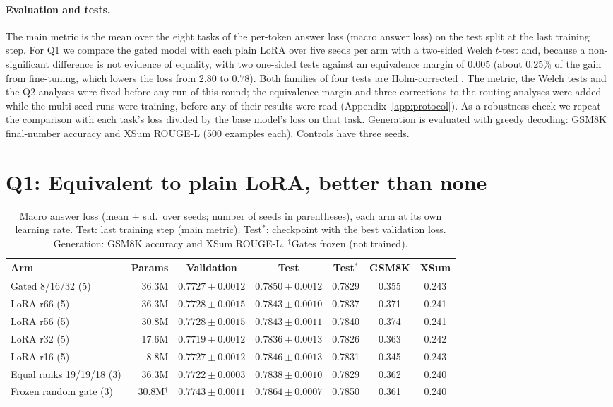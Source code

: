 \documentclass[11pt]{article}
\begin{document}
\paragraph{Evaluation and tests.} The main metric is the mean over the eight tasks of the
per-token answer loss (macro answer loss) on the test split at the last training step. For Q1 we
compare the gated model with each plain LoRA over five seeds per arm with a two-sided Welch
$t$-test and, because a non-significant difference is not evidence of equality, with two
one-sided tests \citep{schuirmann1987tost} against an equivalence margin of $0.005$ (about
0.25\% of the gain from fine-tuning, which lowers the loss from $2.80$ to $0.78$). Both families
of four tests are Holm-corrected \citep{holm1979}. The metric, the Welch tests and the Q2 analyses were
fixed before any run of this round; the equivalence margin and three corrections to the routing
analyses were added while the multi-seed runs were training, before any of their results were
read (Appendix~\ref{app:protocol}). As a robustness check we repeat the comparison with each task's
loss divided by the base model's loss on that task. Generation is evaluated with greedy decoding:
GSM8K final-number accuracy and XSum ROUGE-L (500 examples each). Controls have three seeds.

\section{Q1: Equivalent to plain LoRA, better than none}
\label{sec:q1}
\begin{table}[t]
\centering
\caption{Macro answer loss (mean $\pm$ s.d.\ over seeds; number of seeds in parentheses), each
arm at its own learning rate. Test: last training step (main metric). Test$^\ast$: checkpoint
with the best validation loss. Generation: GSM8K accuracy and XSum ROUGE-L. $^\dagger$Gates
frozen (not trained).}
\label{tab:q1}
\small\setlength{\tabcolsep}{4.5pt}
\begin{tabular}{lrccccc}
\toprule
Arm & Params & Validation & Test & Test$^\ast$ & GSM8K & XSum \\
\midrule
Gated 8/16/32 (5) & 36.3M & $0.7727 \pm 0.0012$ & $0.7850 \pm 0.0012$ & 0.7829 & 0.355 & 0.243 \\
LoRA r66 (5)      & 36.3M & $0.7728 \pm 0.0015$ & $0.7843 \pm 0.0010$ & 0.7837 & 0.371 & 0.241 \\
LoRA r56 (5)      & 30.8M & $0.7728 \pm 0.0015$ & $0.7843 \pm 0.0011$ & 0.7840 & 0.374 & 0.241 \\
LoRA r32 (5)      & 17.6M & $0.7719 \pm 0.0012$ & $0.7836 \pm 0.0013$ & 0.7826 & 0.363 & 0.242 \\
LoRA r16 (5)      &  8.8M & $0.7727 \pm 0.0012$ & $0.7846 \pm 0.0013$ & 0.7831 & 0.345 & 0.243 \\
\midrule
Equal ranks 19/19/18 (3) & 36.3M & $0.7722 \pm 0.0003$ & $0.7838 \pm 0.0010$ & 0.7829 & 0.362 & 0.240 \\
Frozen random gate (3)   & 30.8M$^\dagger$ & $0.7743 \pm 0.0011$ & $0.7864 \pm 0.0007$ & 0.7850 & 0.361 & 0.240 \\
\bottomrule
\end{tabular}
\end{table}
\end{document}
